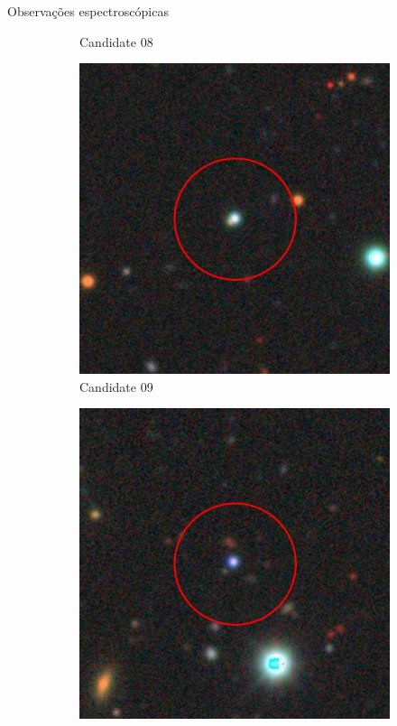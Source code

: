 \begin{frame}[c]{Observações espectroscópicas}
\begin{figure}
\begin{subfigure}[b]{0.11\textwidth}
        \caption{Candidate 08}
    \end{subfigure}
    \begin{subfigure}[b]{0.11\textwidth}
        \includegraphics[width=\textwidth]{images/proposatal_candidatas_1/UCG09.jpg}
        \caption{Candidate 09}
    \end{subfigure}
    \begin{subfigure}[b]{0.11\textwidth}
        \includegraphics[width=\textwidth]{images/proposatal_candidatas_1/UCG10.jpg}

\end{subfigure}
\end{figure}
\end{frame}
